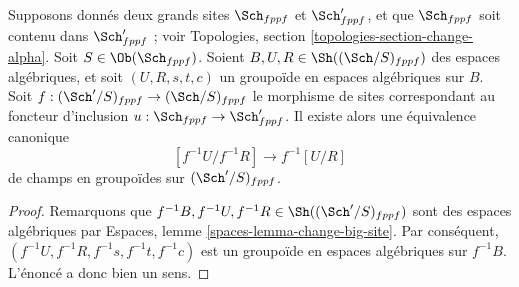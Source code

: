 \begin{lemma}
\label{lemma-quotient-stack-change-big-site}
Supposons donnés deux grands sites $\Sch_{fppf}$ et $\Sch'_{fppf}$, et que
$\Sch_{fppf}$ soit contenu dans $\Sch'_{fppf}$ ; voir Topologies, section
\ref{topologies-section-change-alpha}. Soit $S \in \Ob(\Sch_{fppf})$.
Soient $B, U, R \in \Sh((\Sch/S)_{fppf})$ des espaces algébriques, et soit
$(U, R, s, t, c)$ un groupoïde en espaces algébriques sur $B$. Soit
$f : (\Sch'/S)_{fppf} \to (\Sch/S)_{fppf}$ le morphisme de sites
correspondant au foncteur d'inclusion
$u : \Sch_{fppf} \to \Sch'_{fppf}$. Il existe alors une équivalence canonique
$$
[f^{-1}U/f^{-1}R]
\longrightarrow
f^{-1}[U/R]
$$
de champs en groupoïdes sur $(\Sch'/S)_{fppf}$.
\end{lemma}

\begin{proof}
Remarquons que $f^{-1}B, f^{-1}U, f^{-1}R \in
\Sh((\Sch'/S)_{fppf})$ sont des espaces algébriques par Espaces, lemme
\ref{spaces-lemma-change-big-site}. Par conséquent,
$(f^{-1}U, f^{-1}R, f^{-1}s, f^{-1}t, f^{-1}c)$ est un groupoïde en
espaces algébriques sur $f^{-1}B$. L'énoncé a donc bien un sens.


\end{proof}
